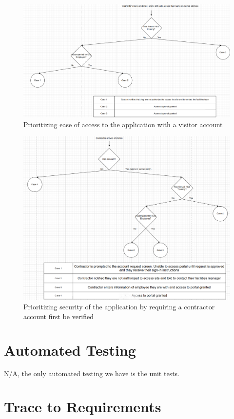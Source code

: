 \documentclass[12pt, titlepage]{article}
\begin{document}
\begin{figure}[h!]
  \includegraphics[scale=0.7]{ease_of_access.png}
  \caption{Prioritizing ease of access to the application with a
  visitor account}
\end{figure}
\newpage
\begin{figure}[h!]
  \includegraphics[scale=0.7]{trusted_access.png}
  \caption{Prioritizing security of the application
  by requiring a contractor account first be verified}
\end{figure}
\newpage
\section{Automated Testing}
N/A, the only automated testing we have is the unit tests.

\section{Trace to Requirements}
\end{document}

